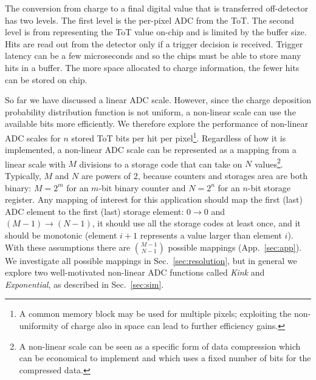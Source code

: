 \documentclass[12pt]{article}
\begin{document}
The conversion from charge to a final digital value that is transferred off-detector has two levels.  The first level is the per-pixel ADC from the ToT.  The second level is from representing the ToT value on-chip and is limited by the buffer size.  Hits are read out from the detector only if a trigger decision is received.  Trigger latency can be a few microseconds and so the chips must be able to store many hits in a buffer.  The more space allocated to charge information, the fewer hits can be stored on chip.   %

So far we have discussed a linear ADC scale. 
However, since the charge deposition probability distribution function is not uniform,
a non-linear scale can use the available bits more efficiently. We therefore explore the performance of non-linear
ADC scales for $n$ stored ToT bits per hit per pixel\footnote{A common memory block may be used for multiple pixels; exploiting the non-uniformity of charge also in space can lead to further efficiency gains.}. 
Regardless of how it is implemented, a non-linear ADC scale can be represented as a mapping from a linear 
scale with $M$ divisions to a storage code that can take on $N$ values\footnote{A non-linear scale can be seen as a specific form of data compression which can be economical to implement and which uses a fixed number of bits for the compressed data.}.
Typically, $M$ and $N$ are powers of 2, because counters and storages area are both binary: 
$M=2^m$ for an $m$-bit binary counter and $N=2^n$ for an $n$-bit storage register. 
Any mapping of interest for this application should map the first (last) ADC element to the first (last) storage element:
$0 \rightarrow 0$  and $(M-1) \rightarrow (N-1)$, it should use all the storage codes at least once,
 and it should be monotonic (element $i+1$ represents a value larger than element $i$). With these
assumptions there are ${M-1} \choose {N-1}$ possible mappings (App.~\ref{sec:app}). We investigate all possible mappings 
in Sec.~\ref{sec:resolution}, but in general we explore two well-motivated non-linear ADC functions called \textit{Kink} and \textit{Exponential},
as described in Sec.~\ref{sec:sim}. 
\end{document}
